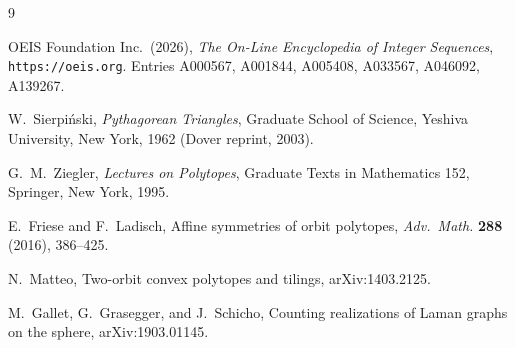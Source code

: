 \documentclass[11pt]{article}
\theoremstyle{definition}
\theoremstyle{remark}
\begin{document}
\begin{thebibliography}{9}

OEIS Foundation Inc.\ (2026), \emph{The On-Line Encyclopedia of Integer
Sequences}, \texttt{https://oeis.org}. Entries A000567, A001844, A005408,
A033567, A046092, A139267.

W.~Sierpi\'nski, \emph{Pythagorean Triangles}, Graduate School of Science,
Yeshiva University, New York, 1962 (Dover reprint, 2003).

G.~M.~Ziegler, \emph{Lectures on Polytopes}, Graduate Texts in
Mathematics 152, Springer, New York, 1995.

E.~Friese and F.~Ladisch, Affine symmetries of orbit polytopes,
\emph{Adv.\ Math.} \textbf{288} (2016), 386--425.

N.~Matteo, Two-orbit convex polytopes and tilings,
arXiv:1403.2125.

M.~Gallet, G.~Grasegger, and J.~Schicho, Counting realizations of Laman
graphs on the sphere, arXiv:1903.01145.

\end{thebibliography}
\end{document}
